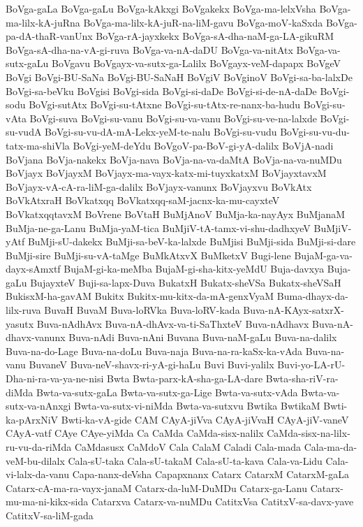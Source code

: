 {BoVga-gaLa
BoVga-gaLu
BoVga-kAkxgi
BoVgakekx
BoVga-ma-lelxVsha
BoVga-ma-lilx-kA-juRna
BoVga-ma-lilx-kA-juR-na-liM-gavu
BoVga-moV-kaSxda
BoVga-pa-dA-thaR-vanUnx
BoVga-rA-jayxkekx
BoVga-sA-dha-naM-ga-LA-gikuRM
BoVga-sA-dha-na-vA-gi-ruva
BoVga-va-nA-daDU
BoVga-va-nitAtx
BoVga-va-sutx-gaLu
BoVgavu
BoVgayx-va-sutx-ga-Lalilx
BoVgayx-veM-dapapx
BoVgeV
BoVgi
BoVgi-BU-SaNa
BoVgi-BU-SaNaH
BoVgiV
BoVginoV
BoVgi-sa-ba-lalxDe
BoVgi-sa-beVku
BoVgisi
BoVgi-sida
BoVgi-si-daDe
BoVgi-si-de-nA-daDe
BoVgi-sodu
BoVgi-sutAtx
BoVgi-su-tAtxne
BoVgi-su-tAtx-re-nanx-ba-hudu
BoVgi-su-vAta
BoVgi-suva
BoVgi-su-vanu
BoVgi-su-va-vanu
BoVgi-su-ve-na-lalxde
BoVgi-su-vudA
BoVgi-su-vu-dA-mA-Lekx-yeM-te-nalu
BoVgi-su-vudu
BoVgi-su-vu-du-tatx-ma-shiVla
BoVgi-yeM-deYdu
BoVgoV-pa-BoV-gi-yA-dalilx
BoVjA-nadi
BoVjana
BoVja-nakekx
BoVja-nava
BoVja-na-va-daMtA
BoVja-na-va-nuMDu
BoVjayx
BoVjayxM
BoVjayx-ma-vayx-katx-mi-tuyxkatxM
BoVjayxtavxM
BoVjayx-vA-cA-ra-liM-ga-dalilx
BoVjayx-vanunx
BoVjayxvu
BoVkAtx
BoVkAtxraH
BoVkatxqq
BoVkatxqq-saM-jacnx-ka-mu-cayxteV
BoVkatxqqtavxM
BoVrene
BoVtaH
BuMjAnoV
BuMja-ka-nayAyx
BuMjanaM
BuMja-ne-ga-Lanu
BuMja-yaM-tica
BuMjiV-tA-tamx-vi-shu-dadhxyeV
BuMjiV-yAtf
BuMji-sU-dakekx
BuMji-sa-beV-ka-lalxde
BuMjisi
BuMji-sida
BuMji-si-dare
BuMji-sire
BuMji-su-vA-taMge
BuMkAtxvX
BuMketxV
Bugi-lene
BujaM-ga-va-dayx-sAmxtf
BujaM-gi-ka-meMba
BujaM-gi-sha-kitx-yeMdU
Buja-davxya
Buja-gaLu
BujayxteV
Buji-sa-lapx-Duva
BukatxH
Bukatx-sheVSa
Bukatx-sheVSaH
BukisxM-ha-gavAM
Bukitx
Bukitx-mu-kitx-da-mA-genxVyaM
Buma-dhayx-da-lilx-ruva
BuvaH
BuvaM
Buva-loRVka
Buva-loRV-kada
Buva-nA-KAyx-satxrX-yasutx
Buva-nAdhAvx
Buva-nA-dhAvx-va-ti-SaThxteV
Buva-nAdhavx
Buva-nA-dhavx-vanunx
Buva-nAdi
Buva-nAni
Buvana
Buva-naM-gaLu
Buva-na-dalilx
Buva-na-do-Lage
Buva-na-doLu
Buva-naja
Buva-na-ra-kaSx-ka-vAda
Buva-na-vanu
BuvaneV
Buva-neV-shavx-ri-yA-gi-haLu
Buvi
Buvi-yalilx
Buvi-yo-LA-rU-Dha-ni-ra-va-ya-ne-nisi
Bwta
Bwta-parx-kA-sha-ga-LA-dare
Bwta-sha-riV-ra-diMda
Bwta-va-sutx-gaLa
Bwta-va-sutx-ga-Lige
Bwta-va-sutx-vAda
Bwta-va-sutx-va-nAnxgi
Bwta-va-sutx-vi-niMda
Bwta-va-sutxvu
Bwtika
BwtikaM
Bwti-ka-pArxNiV
Bwti-ka-vA-gide
CAM
CAyA-jiVva
CAyA-jiVvaH
CAyA-jiV-vaneV
CAyA-vatf
CAye
CAye-yiMda
Ca
CaMda
CaMda-sisx-nalilx
CaMda-sisx-na-lilx-ru-vu-da-riMda
CaMdasusx
CaMdoV
Cala
CalaM
Caladi
Cala-mada
Cala-ma-da-veM-bu-dilalx
Cala-sU-taka
Cala-sU-takaM
Cala-sU-ta-kava
Cala-va-Lidu
Cala-vi-lalx-da-vanu
Capa-nanx-deVsha
Capapxnanx
Catarx
CatarxM
CatarxM-gaLa
Catarx-cA-ma-ra-vayx-janaM
Catarx-da-luM-DuMDu
Catarx-ga-Lanu
Catarx-mu-ma-ni-kikx-sida
Catarxva
Catarx-va-nuMDu
CatitxVsa
CatitxV-sa-davx-yave
CatitxV-sa-liM-gada
}
